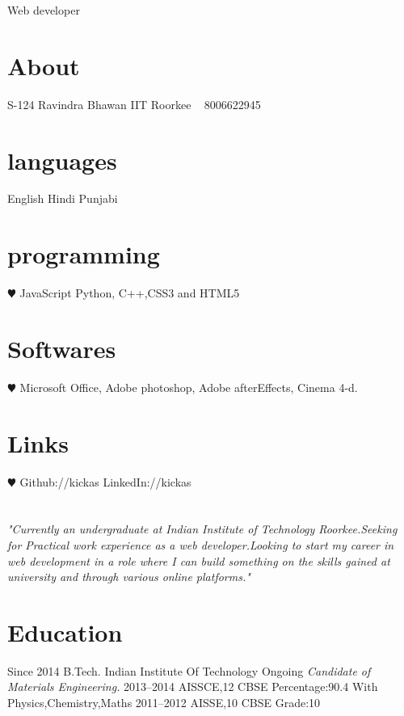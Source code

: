 \documentclass[]{friggeri-cv}
\begin{document}
       { Web developer}
       
       

\begin{aside}
  \section{About}
    S-124
    Ravindra Bhawan
    IIT Roorkee
    ~
    {8006622945}
  \section{languages}
    English
   Hindi
   Punjabi
  \section{programming}
    {\color{red} $\varheartsuit$} JavaScript
    Python, C++,CSS3 and HTML5
    
  \section{Softwares}
    {\color{red} $\varheartsuit$} Microsoft Office,
    Adobe photoshop,
    Adobe afterEffects,
    Cinema 4-d.
    
    \section{Links}
    {\color{red} $\varheartsuit$} 
    Github://kickas
    LinkedIn://kickas
    
    
\end{aside}
\section{}


\entry 
    {\emph{"Currently an undergraduate at Indian Institute of Technology Roorkee.Seeking for Practical work experience as a web developer.Looking to start my career in web development in a role where I can build  something on the skills gained at university and through various online platforms."}}






\section{Education}

\begin{entrylist}
  \entry
    {Since 2014}
    {B.Tech. {\normalfont Indian Institute Of Technology}}
    {Ongoing}
    {\emph{Candidate of Materials Engineering.}}
  \entry
    {2013–2014}
    {AISSCE,12 {\normalfont  CBSE}}
    {Percentage:90.4}
    {With Physics,Chemistry,Maths}
  \entry
    {2011–2012}
    {AISSE,10 {\normalfont  CBSE}}
    {Grade:10}
 
\end{entrylist}
\end{document}
